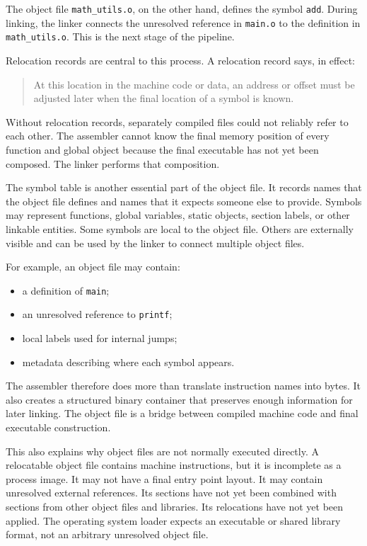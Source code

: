 The object file \texttt{math\_utils.o}, on the other hand, defines the symbol \texttt{add}. During linking, the linker connects the unresolved reference in \texttt{main.o} to the definition in \texttt{math\_utils.o}. This is the next stage of the pipeline.

Relocation records are central to this process. A relocation record says, in effect:

\begin{quote}
At this location in the machine code or data, an address or offset must be adjusted later when the final location of a symbol is known.
\end{quote}

Without relocation records, separately compiled files could not reliably refer to each other. The assembler cannot know the final memory position of every function and global object because the final executable has not yet been composed. The linker performs that composition.

The symbol table is another essential part of the object file. It records names that the object file defines and names that it expects someone else to provide. Symbols may represent functions, global variables, static objects, section labels, or other linkable entities. Some symbols are local to the object file. Others are externally visible and can be used by the linker to connect multiple object files.

For example, an object file may contain:

\begin{itemize}
    \item a definition of \texttt{main};
    \item an unresolved reference to \texttt{printf};
    \item local labels used for internal jumps;
    \item metadata describing where each symbol appears.
\end{itemize}

The assembler therefore does more than translate instruction names into bytes. It also creates a structured binary container that preserves enough information for later linking. The object file is a bridge between compiled machine code and final executable construction.

This also explains why object files are not normally executed directly. A relocatable object file contains machine instructions, but it is incomplete as a process image. It may not have a final entry point layout. It may contain unresolved external references. Its sections have not yet been combined with sections from other object files and libraries. Its relocations have not yet been applied. The operating system loader expects an executable or shared library format, not an arbitrary unresolved object file.

